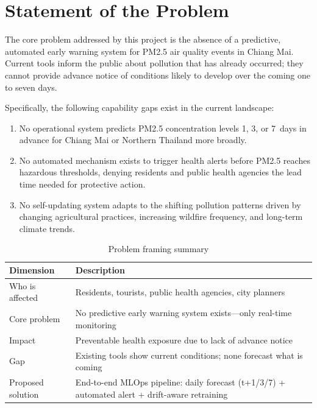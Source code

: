 \documentclass[12pt,a4paper]{report}
\begin{document}
\section{Statement of the Problem}

The core problem addressed by this project is the absence of a predictive, automated early warning system for PM2.5 air quality events in Chiang Mai. Current tools inform the public about pollution that has already occurred; they cannot provide advance notice of conditions likely to develop over the coming one to seven days.

Specifically, the following capability gaps exist in the current landscape:
\begin{enumerate}
  \item No operational system predicts PM2.5 concentration levels 1, 3, or 7~days in advance for Chiang Mai or Northern Thailand more broadly.
  \item No automated mechanism exists to trigger health alerts before PM2.5 reaches hazardous thresholds, denying residents and public health agencies the lead time needed for protective action.
  \item No self-updating system adapts to the shifting pollution patterns driven by changing agricultural practices, increasing wildfire frequency, and long-term climate trends.
\end{enumerate}

\begin{table}[H]
\centering
\caption{Problem framing summary}
\label{tab:problem_framing}
\begin{tabular}{@{}lp{9.5cm}@{}}
\toprule
\textbf{Dimension} & \textbf{Description} \\
\midrule
Who is affected    & Residents, tourists, public health agencies, city planners \\[4pt]
Core problem       & No predictive early warning system exists---only real-time monitoring \\[4pt]
Impact             & Preventable health exposure due to lack of advance notice \\[4pt]
Gap                & Existing tools show current conditions; none forecast what is coming \\[4pt]
Proposed solution  & End-to-end MLOps pipeline: daily forecast (t+1/3/7) + automated alert + drift-aware retraining \\
\bottomrule
\end{tabular}
\end{table}
\end{document}
